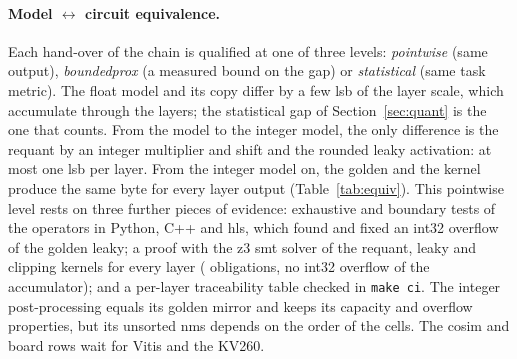 \documentclass[11pt,a4paper]{article}
\begin{document}
\paragraph{Model $\leftrightarrow$ circuit equivalence.} Each hand-over of the chain is
qualified at one of three levels: \emph{\gls{pointwise}} (same output), \emph{\gls{boundedprox}}
(a measured bound on the gap) or \emph{statistical} (same task metric). The float model and
its  copy differ by a few \gls{lsb} of the layer scale, which accumulate through the
layers; the statistical gap of Section~\ref{sec:quant} is the one that counts. From the
 model to the integer model, the only difference is the \gls{requant} by an
integer multiplier and shift and the rounded leaky activation: at most one \gls{lsb} per layer.
From the integer model on, the \gls{golden} and the  kernel produce the same
byte for every layer output (Table~\ref{tab:equiv}). This \gls{pointwise} level rests on three
further pieces of evidence: exhaustive and boundary tests of the operators in Python, C++
and \gls{hls}, which found and fixed an int32 overflow of the golden leaky; a proof with the z3
\gls{smt} solver of the \gls{requant}, leaky and clipping kernels for every layer
( obligations, no int32 overflow of the accumulator); and a
per-layer traceability table checked in \texttt{make ci}. The integer post-processing equals
its golden mirror and keeps its capacity and overflow properties, but its unsorted \gls{nms}
depends on the order of the cells. The \gls{cosim} and board rows wait for Vitis and the
KV260.

\begin{table}[htbp]
\caption{Equivalence per stage on 20 images per network ():
gaps in \gls{lsb} of the layer output scale, then the level of the later stages. The \gls{cosim}
and board stages are pending.}
\label{tab:equiv}
\footnotesize{}
\end{table}
\end{document}
